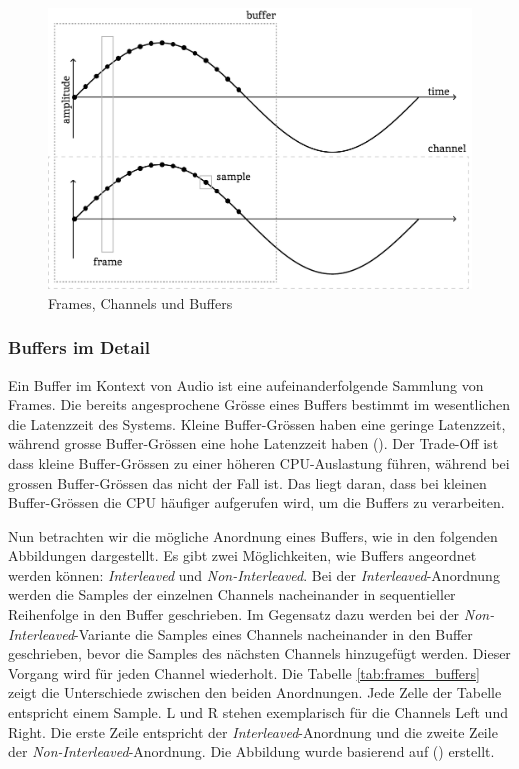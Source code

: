\documentclass[11pt,a4paper]{article}
\begin{document}
\begin{figure}[h]
	\centering
	\includegraphics[width=0.7\linewidth]{img/audio-nutshell.pdf}
	\caption{Frames, Channels und Buffers}
	\label{fig:frames_channels_buffers}
\end{figure}

\subsubsection{Buffers im Detail}
Ein Buffer im Kontext von Audio ist eine aufeinanderfolgende Sammlung von Frames. Die bereits
angesprochene Grösse eines Buffers bestimmt im wesentlichen die Latenzzeit des Systems. Kleine
Buffer-Grössen haben eine geringe Latenzzeit, während grosse Buffer-Grössen eine hohe Latenzzeit
haben (\cite[p.10]{somberg2019audioapi}). Der Trade-Off ist dass kleine Buffer-Grössen
zu einer höheren CPU-Auslastung führen, während bei grossen Buffer-Grössen das nicht der Fall ist.
Das liegt daran, dass bei kleinen Buffer-Grössen die CPU häufiger aufgerufen wird, um die Buffers
zu verarbeiten.

\noindent \newline
Nun betrachten wir die mögliche Anordnung eines Buffers, wie in den folgenden Abbildungen
dargestellt. Es gibt zwei Möglichkeiten, wie Buffers angeordnet werden
können: \textit{Interleaved} und \textit{Non-Interleaved}. Bei der \textit{Interleaved}-Anordnung
werden die Samples der einzelnen Channels nacheinander in sequentieller Reihenfolge in den Buffer
geschrieben. Im Gegensatz dazu werden bei der \textit{Non-Interleaved}-Variante die Samples
eines Channels nacheinander in den Buffer geschrieben, bevor die Samples des nächsten Channels
hinzugefügt werden. Dieser Vorgang wird für jeden Channel wiederholt. Die Tabelle
\ref{tab:frames_buffers} zeigt die Unterschiede zwischen den beiden Anordnungen. Jede Zelle der
Tabelle entspricht einem Sample. L und R stehen exemplarisch für die Channels Left und Right.
Die erste Zeile entspricht der \textit{Interleaved}-Anordnung und die zweite Zeile der
\textit{Non-Interleaved}-Anordnung. Die Abbildung wurde basierend auf
(\cite[p.11]{somberg2019audioapi}) erstellt.
\end{document}
